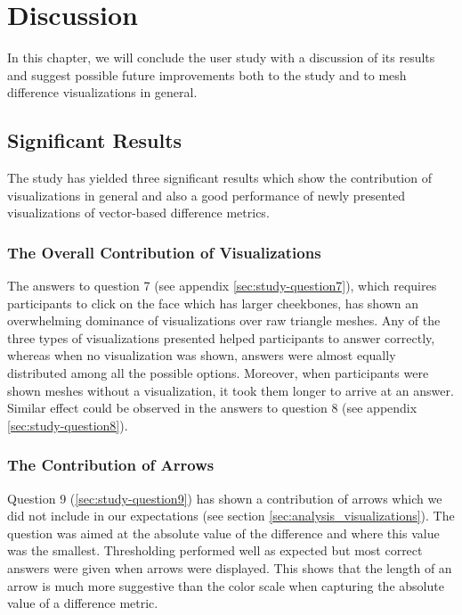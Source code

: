 \chapter{Discussion}

In this chapter, we will conclude the user study with a discussion of its results and suggest possible future improvements both to the study and to mesh difference visualizations in general.

\section{Significant Results}

The study has yielded three significant results which show the contribution of visualizations in general and also a good performance of newly presented visualizations of vector-based difference metrics.

\subsection{The Overall Contribution of Visualizations}

The answers to question 7 (see appendix \ref{sec:study-question7}), which requires participants to click on the face which has larger cheekbones, has shown an overwhelming dominance of visualizations over raw triangle meshes. Any of the three types of visualizations presented helped participants to answer correctly, whereas when no visualization was shown, answers were almost equally distributed among all the possible options. Moreover, when participants were shown meshes without a visualization, it took them longer to arrive at an answer. Similar effect could be observed in the answers to question 8 (see appendix \ref{sec:study-question8}).

\subsection{The Contribution of Arrows}

Question 9 (\ref{sec:study-question9}) has shown a contribution of arrows which we did not include in our expectations (see section \ref{sec:analysis_visualizations}). The question was aimed at the absolute value of the difference and where this value was the smallest. Thresholding performed well as expected but most correct answers were given when arrows were displayed. This shows that the length of an arrow is much more suggestive than the color scale when capturing the absolute value of a difference metric.

